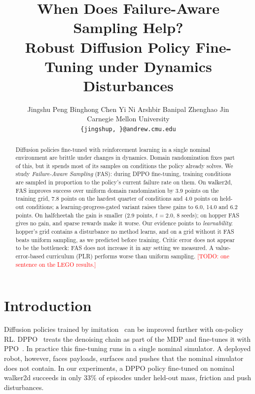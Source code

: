 \documentclass{article}
\title{When Does Failure-Aware Sampling Help?\\Robust Diffusion Policy Fine-Tuning under Dynamics Disturbances}
\author{
  Jingshu Peng \And Binghong Chen \And Yi Ni \And Arshbir Banipal \And Zhenghao Jin \\
  Carnegie Mellon University \\
  \texttt{\{jingshup, \todo{andrew IDs}\}@andrew.cmu.edu}
}
\newcommand{\todo}[1]{\textcolor{red}{[TODO: #1]}}
\newcommand{\fas}{\textsc{FAS}}
\begin{document}
\maketitle

\begin{abstract}
Diffusion policies fine-tuned with reinforcement learning in a single nominal environment are brittle under changes in dynamics.
Domain randomization fixes part of this, but it spends most of its samples on conditions the policy already solves.
We study \emph{Failure-Aware Sampling} (\fas{}): during DPPO fine-tuning, training conditions are sampled in proportion to the policy's current failure rate on them.
On walker2d, \fas{} improves success over uniform domain randomization by 3.9 points on the training grid, 7.8 points on the hardest quarter of conditions and 4.0 points on held-out conditions; a learning-progress-gated variant raises these gains to 6.0, 14.0 and 6.2 points.
On halfcheetah the gain is smaller (2.9 points, $t=2.0$, 8 seeds); on hopper \fas{} gives no gain, and sparse rewards make it worse.
Our evidence points to \emph{learnability}: hopper's grid contains a disturbance no method learns, and on a grid without it \fas{} beats uniform sampling, as we predicted before training.
Critic error does not appear to be the bottleneck: \fas{} does not increase it in any setting we measured. A value-error-based curriculum (PLR) performs worse than uniform sampling.
\todo{one sentence on the LEGO results.}
\end{abstract}


\section{Introduction}
\label{sec:intro}

Diffusion policies trained by imitation~\citep{chi2023diffusion} can be improved further with on-policy RL. DPPO~\citep{ren2025dppo} treats the denoising chain as part of the MDP and fine-tunes it with PPO~\citep{schulman2017ppo}.
In practice this fine-tuning runs in a single nominal simulator. A deployed robot, however, faces payloads, surfaces and pushes that the nominal simulator does not contain.
In our experiments, a DPPO policy fine-tuned on nominal walker2d succeeds in only 33\% of episodes under held-out mass, friction and push disturbances.
\end{document}
